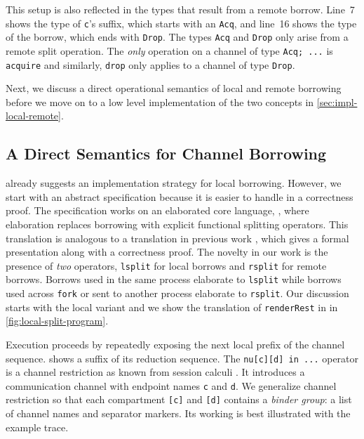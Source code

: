 This setup is also reflected in the types that result from a remote
borrow. Line~7 shows the type of \lstinline{c}'s suffix, which starts
with an \lstinline{Acq}, and line~16 shows the type of the borrow,
which ends with \lstinline{Drop}. The types \lstinline{Acq} and
\lstinline{Drop} only arise from a remote split operation. The
\emph{only} operation on a channel of type
\lstinline{Acq; ...} is \lstinline{acquire} and similarly,
\lstinline{drop} only applies to a channel of type \lstinline{Drop}.

Next, we discuss a direct operational semantics of local and remote borrowing
before we move on to a low level implementation of the two concepts in
\cref{sec:impl-local-remote}.

\subsection{A Direct Semantics for Channel Borrowing}
\label{sec:direct-semant-chann}

 already suggests an implementation strategy
for local borrowing. However, we start with an abstract
specification because it is easier to handle in a correctness
proof. The specification works on an elaborated core 
language, \thecalculus, where elaboration replaces borrowing with
explicit functional splitting 
operators. This translation is analogous to a translation in previous work
\cite{DBLP:journals/pacmpl/SaffrichS0V25}, which gives a formal
presentation along with a correctness proof. The novelty in our work
is the presence of \emph{two} operators, \lstinline{lsplit} for local
borrows and \lstinline{rsplit} for remote borrows. Borrows used in the
same process elaborate to \lstinline{lsplit} while borrows used across
\lstinline{fork} or sent to another process elaborate to
\lstinline{rsplit}.  Our discussion starts with the local variant and 
we show the translation of \lstinline{renderRest} in
\thecalculus in \cref{fig:local-split-program}.

Execution proceeds by repeatedly exposing the next local prefix of the
channel sequence.  shows a suffix of its reduction
sequence.
The \lstinline{nu[c][d] in ...} operator is a channel restriction as known
from session calculi \cite{Gay_Vasconcelos_2025}. It introduces a
communication channel with endpoint names \lstinline{c} and 
\lstinline{d}. We generalize channel restriction so that each
compartment \lstinline{[c]} and \lstinline{[d]} contains a
\emph{binder group}: a list of channel names and separator markers.
Its working is best illustrated with the example trace.

